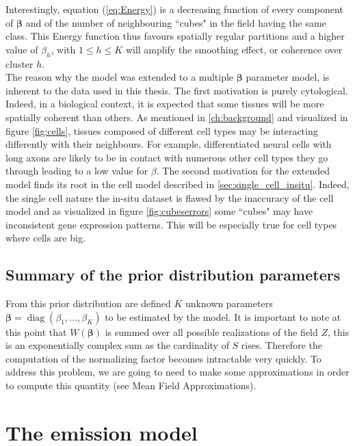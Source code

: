  Interestingly, equation (\ref{eq:Energy}) is a decreasing function of every component of $\boldsymbol{\beta}$ and of the number of neighbouring ``cubes" in the field having the same class. This Energy function thus favours spatially regular partitions and a higher value of $\beta_h$, with $1 \leq h \leq K $ will amplify the smoothing effect, or coherence over cluster $h$.\\
 
 The reason why the model was extended to a multiple $\boldsymbol{\beta}$ parameter model, is inherent to the data used in this thesis. The first motivation is purely cytological. Indeed, in a biological context, it is expected that some tissues will be more spatially coherent than others. As mentioned in \ref{ch:background} and visualized in figure \ref{fig:cells}, tissues composed of different cell types may be interacting differently with their neighbours. For example, differentiated neural cells with long axons are likely to be in contact with numerous other cell types they go through leading to a low value for $\beta$. The second motivation for the extended model finds its root in the cell model described in \ref{sec:single_cell_insitu}. Indeed, the single cell nature the in-situ dataset is flawed by the inaccuracy of the cell model and as visualized in figure \ref{fig:cubeserrors} some ``cubes" may have inconsistent gene expression patterns. This will be especially true for cell types where cells are big.\\
 
 \subsection{Summary of the prior distribution parameters}

From this prior distribution are defined $K$ unknown parameters $\boldsymbol{\beta} = \operatorname{diag}(\beta_{1},...,\beta_{K})$ to be estimated by the model. It is important to note at this point that $W(\boldsymbol{\beta})$ is summed over all possible realizations of the field $Z$, this is an exponentially complex sum as the cardinality of $S$ rises. Therefore the computation of the normalizing factor becomes intractable very quickly. To address this problem, we are going to need to make some approximations in order to compute this quantity (see Mean Field Approximations).\\

\section{The emission model}

